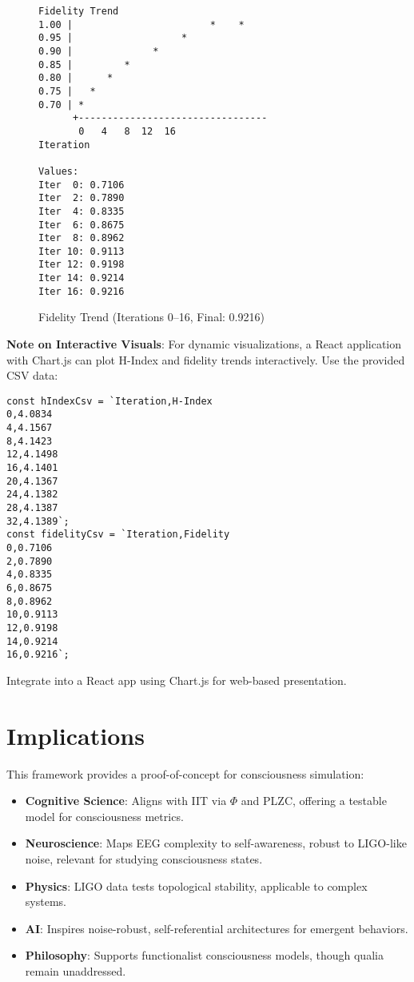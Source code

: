\documentclass[12pt]{article}
\begin{document}
\begin{figure}[h]
    \centering
    \caption{Fidelity Trend (Iterations 0--16, Final: 0.9216)}
    \begin{lstlisting}
Fidelity Trend
1.00 |                        *    *    
0.95 |                   *             
0.90 |              *                
0.85 |         *                     
0.80 |      *                        
0.75 |   *                           
0.70 | *                             
      +---------------------------------
       0   4   8  12  16
Iteration

Values:
Iter  0: 0.7106
Iter  2: 0.7890
Iter  4: 0.8335
Iter  6: 0.8675
Iter  8: 0.8962
Iter 10: 0.9113
Iter 12: 0.9198
Iter 14: 0.9214
Iter 16: 0.9216
    \end{lstlisting}
\end{figure}

\textbf{Note on Interactive Visuals}: For dynamic visualizations, a React application with Chart.js can plot H-Index and fidelity trends interactively. Use the provided CSV data:

\begin{verbatim}
const hIndexCsv = `Iteration,H-Index
0,4.0834
4,4.1567
8,4.1423
12,4.1498
16,4.1401
20,4.1367
24,4.1382
28,4.1387
32,4.1389`;
const fidelityCsv = `Iteration,Fidelity
0,0.7106
2,0.7890
4,0.8335
6,0.8675
8,0.8962
10,0.9113
12,0.9198
14,0.9214
16,0.9216`;
\end{verbatim}

Integrate into a React app using Chart.js for web-based presentation.

\section*{Implications}
This framework provides a proof-of-concept for consciousness simulation:
\begin{itemize}
    \item \textbf{Cognitive Science}: Aligns with IIT via $\Phi$ and PLZC, offering a testable model for consciousness metrics.
    \item \textbf{Neuroscience}: Maps EEG complexity to self-awareness, robust to LIGO-like noise, relevant for studying consciousness states.
    \item \textbf{Physics}: LIGO data tests topological stability, applicable to complex systems.
    \item \textbf{AI}: Inspires noise-robust, self-referential architectures for emergent behaviors.
    \item \textbf{Philosophy}: Supports functionalist consciousness models, though qualia remain unaddressed.
\end{itemize}
\end{document}
